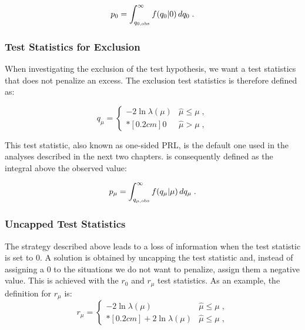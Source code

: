 \begin{equation}
\label{eq:stat:p0}
p_{0} = \int_{q_{0,{\rm obs}}}^{\infty} f(q_{0} | 0 ) \, d q_{0} \;.
\end{equation}

\subsubsection*{Test Statistics for Exclusion}

When investigating the exclusion of the test hypothesis, we want a test statistics that does not penalize an excess. The exclusion test statistics \qmu is therefore defined as:

\begin{equation}
\label{eq:stat:qmu}
q_{\mu} =
\left\{ \! \! \begin{array}{ll}
               - 2 \ln \lambda(\mu)  & \hat{\mu} \le \mu  \;, \\*[0.2 cm]
               0 & \hat{\mu} > \mu \;,
              \end{array}
       \right.
\end{equation}

\noindent This test statistic, also known as one-sided PRL, is the default one used in the analyses described in the next two chapters. \pmu is consequently defined as the integral above the observed value: 

\begin{equation}
\label{eq:stat:pmu}
p_{\mu} = \int_{q_{\mu,{\rm obs}}}^{\infty} f(q_{\mu} | \mu ) \, d q_{\mu} \;.
\end{equation}


\subsubsection*{Uncapped Test Statistics}

The strategy described above leads to a loss of information when the test statistic is set to 0. A solution is obtained by uncapping the test statistic and, instead of assigning a 0 to the situations we do not want to penalize, assign them a negative value. This is achieved with the $r_0$ and $r_\mu$ test statistics. As an example, the definition for $r_\mu$ is:
\begin{equation}
\label{eq:rmu}
r_{\mu} =
\left\{ \! \! \begin{array}{ll}
               - 2 \ln \lambda(\mu)  & \hat{\mu} \le \mu  \;, \\*[0.2 cm]
               + 2 \ln \lambda(\mu)  & \hat{\mu} \le \mu  \;,
              \end{array}
       \right.
\end{equation}

